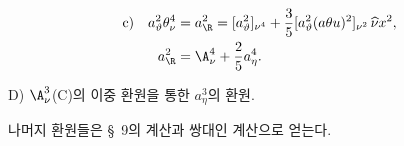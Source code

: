 
\[
\begin{aligned}
\text{c)}\quad
 a_\vartheta^2\theta_\nu^4
&=a_\R^2=[a_\vartheta^2]_{\nu^4}+\frac35[a_\vartheta^2(a\theta u)^2]_{\nu^2}\,\widehat{\nu}x^2,\\
a_\R^2&=\A_\nu^4+\frac25a_\eta^4.
\end{aligned}
\]

\noindent D) $\A_\nu^3$(C)의 이중 환원을 통한 $a_\eta^3$의 환원.

나머지 환원들은 \S\ 9의 계산과 쌍대인 계산으로 얻는다.
